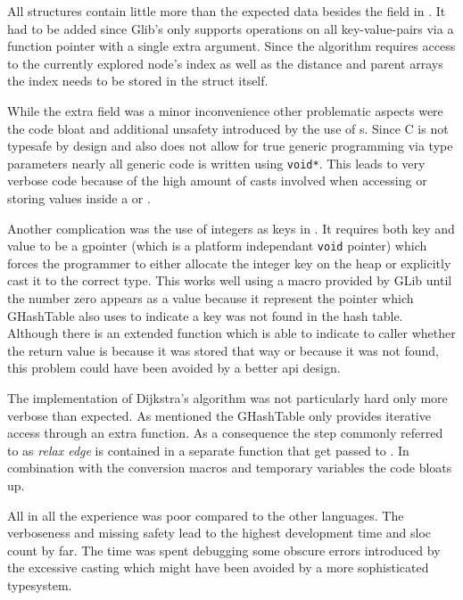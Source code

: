 All structures contain little more than the expected data besides the  field in . It had to be added since Glib's  only supports operations on all key-value-pairs via a function pointer with a single extra argument. Since the algorithm requires access to the currently explored node's index as well as the distance and parent arrays the index needs to be stored in the struct itself.

While the extra field was a minor inconvenience other problematic aspects were the code bloat and additional unsafety introduced by the use of s. Since C is not typesafe by design and also does not allow for true generic programming via type parameters nearly all generic code is written using \lstinline[style=c]{void*}. This leads to very verbose code because of the high amount of casts involved when accessing or storing values inside a  or .

Another complication was the use of integers as keys in . It requires both key and value to be a gpointer (which is a platform independant \lstinline{void} pointer) which forces the programmer to either allocate the integer key on the heap or explicitly cast it to the correct type. This works well using a macro provided by GLib until the number zero appears as a value because it represent the  pointer which GHashTable also uses to indicate a key was not found in the hash table. Although there is an extended function which is able to indicate to caller whether the return value is  because it was stored that way or because it was not found, this problem could have been avoided by a better \acrshort{api} design.

The implementation of Dijkstra's algorithm was not particularly hard only more verbose than expected. As mentioned the GHashTable only provides iterative access through an extra function. As a consequence the step commonly referred to as \textit{relax edge} is contained in a separate function that get passed to . In combination with the conversion macros and temporary variables the code bloats up.

All in all the experience was poor compared to the other languages. The verboseness and missing safety lead to the highest development time and \gls{sloc} count by far. The time was spent debugging some obscure errors introduced by the excessive casting which might have been avoided by a more sophisticated typesystem.

